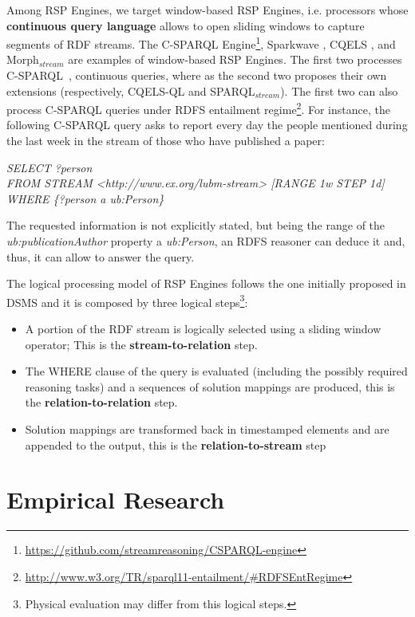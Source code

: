 Among RSP Engines, we target window-based RSP Engines, i.e. processors whose \textbf{continuous query language} allows to open sliding windows to capture segments of RDF streams. The C-SPARQL Engine\footnote{\url{https://github.com/streamreasoning/CSPARQL-engine}}, Sparkwave \cite{DBLP:conf/debs/KomazecCF12}, CQELS \cite{Lephuoc2011}, and Morph$_{stream}$ \cite{DBLP:journals/ijswis/CalbimonteJCA12}  are examples of window-based RSP Engines.  The first two processes C-SPARQL~\cite{Barbieri2010}, continuous queries, where as the second two proposes their own extensions (respectively, CQELS-QL and SPARQL$_{stream}$). The first two can also process C-SPARQL queries under RDFS entailment regime\footnote{\url{http://www.w3.org/TR/sparql11-entailment/#RDFSEntRegime}}. For instance, the following C-SPARQL query asks to report every day the people mentioned during the last week in the stream of those who have published a paper:

\vspace{5pt}
\noindent\textit{SELECT ?person}\\
\textit{FROM STREAM <http://www.ex.org/lubm-stream> [RANGE 1w STEP 1d]}\\
\textit{WHERE \{?person a ub:Person\}}
\vspace{5pt}

The requested information is not explicitly stated, but being the range of the \textit{ub:publicationAuthor} property a \textit{ub:Person}, an RDFS reasoner can deduce it and, thus, it can allow to answer the query.

The logical processing model of RSP Engines follows the one initially proposed in DSMS and it is composed by three logical steps\footnote{Physical evaluation may differ from this logical steps.}: 
\begin{itemize}
\item[1.] A portion of the RDF stream is logically selected using a sliding window operator; This is the \textbf{stream-to-relation} step. 
\item[2.] The WHERE clause of the query is evaluated (including the possibly required reasoning tasks) and a sequences of solution mappings are produced, this is the \textbf{relation-to-relation} step.
\item[3.] Solution mappings are transformed back in timestamped elements and are appended to the output, this is the \textbf{relation-to-stream} step 
\end{itemize}


\section{Empirical Research}\label{sec:empirical-research}

